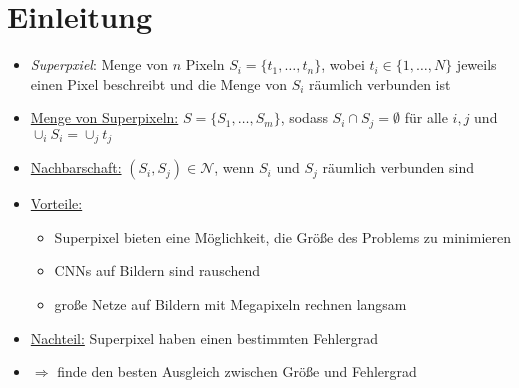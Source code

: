 \section{Einleitung}

\begin{itemize}
  \item \emph{Superpxiel}: Menge von $n$ Pixeln $S_i = \lbrace t_1, \ldots, t_n \rbrace$, wobei $t_i \in \lbrace 1, \ldots, N \rbrace$ jeweils einen Pixel beschreibt und die Menge von $S_i$ räumlich verbunden ist
  \item \underline{Menge von Superpixeln:} $S = \lbrace S_1, \ldots, S_m \rbrace$, sodass $S_i \cap S_j = \emptyset$ für alle $i, j$ und $\cup_i S_i = \cup_j t_j$
  \item \underline{Nachbarschaft:} $(S_i, S_j) \in \mathcal{N}$, wenn $S_i$ und $S_j$ räumlich verbunden sind
  \item \underline{Vorteile:}
  \begin{itemize}
    \item Superpixel bieten eine Möglichkeit, die Größe des Problems zu minimieren
    \item CNNs auf Bildern sind rauschend
    \item große Netze auf Bildern mit Megapixeln rechnen langsam
  \end{itemize}
  \item \underline{Nachteil:} Superpixel haben einen bestimmten Fehlergrad
  \item $\Rightarrow$ finde den besten Ausgleich zwischen Größe und Fehlergrad
\end{itemize}
